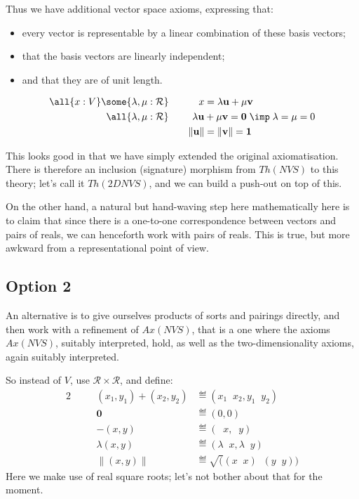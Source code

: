 \documentclass{my-blue-book}
\newcommand{\real}{\mathcal{R}}
\renewcommand{\real}{\mathcal{R}}
\DeclareMathOperator{\plusR}{+_{\real}}
\DeclareMathOperator{\timesR}{\times_{\real}}
\DeclareMathOperator{\minusR}{-_{\real}}
\newcommand{\origin}{\mathbf{0}}
\newcommand{\one}{\mathbf{1}}
\newcommand{\norm}[1]{\lVert#1\rVert}
\newcommand{\realTwo}{\real \times \real}
\newcommand{\vecU}{\mathbf{u}}
\newcommand{\vecV}{\mathbf{v}}
\begin{document}
Thus we have additional vector space axioms, expressing that:
\begin{itemize}
\item every vector is representable by a linear combination of
these basis vectors;
\item that the basis vectors are linearly
independent;
\item and that they are of unit length.
\end{itemize}
\vspace{-1cm}
\begin{center}
  \begin{alignat}{2}
    \all{x:V} \some{\lambda,\mu:\real} \quad&&
                x  &= \lambda\vecU + \mu\vecV \\
    \all{\lambda,\mu:\real} \quad &&
                \lambda\vecU &+ \mu\vecV  = \origin  \; \imp  \;
                \lambda = \mu = 0 \\
       \quad&& \norm{\vecU}   &=  \norm{\vecV} = \one
  \end{alignat}
\end{center}

This looks good in that we have simply extended the original
axiomatisation. There is therefore an inclusion (signature)
morphism from $Th(NVS)$ to this theory; let's call it $Th(2DNVS)$,
and we can build a push-out on top of this.

On the other hand, a natural but hand-waving step here mathematically
here is to claim that since there is a one-to-one correspondence
between vectors and pairs of reals, we can henceforth work with pairs
of reals.  This is true, but more awkward from a representational
point of view.


\subsection{Option 2}
\label{sec:option-2}
 
An alternative is to give ourselves products of sorts and pairings
directly, and then work with a refinement of $Ax(NVS)$, that is
a one where the axioms $Ax(NVS)$, suitably interpreted, hold, as well
as the two-dimensionality axioms, again suitably interpreted.

So instead of $V$, use $\realTwo$, and define:
\begin{alignat}{2}
  \quad&& (x_1,y_1) + (x_2,y_2) &\eqdef (x_1 \plusR x_2, y_1 \plusR y_2) \\
  \quad&&   \origin            &\eqdef (0,0) \\
  \quad&& -(x,y)            &\eqdef (\minusR x, \minusR y)\\
  \quad&& \lambda(x,y)      &\eqdef (\lambda \timesR x, \lambda \timesR y)\\
  \quad&& \norm{(x,y)}       & \eqdef \sqrt((x \timesR x) \plusR (y \timesR y))
\end{alignat}
Here we make use of real square roots; let's not bother about that for
the moment.  
\end{document}

